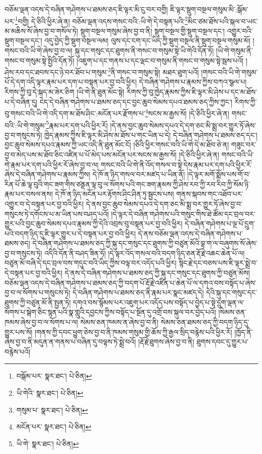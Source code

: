 བཅོམ་ལྡན་འདས་དེ་བཞིན་གཤེགས་པ་ཐམས་ཅད་ཇི་ལྟར་མི་ངུ་བར་བགྱི། ཇི་ལྟར་སྡུག་བསྔལ་གསུམ་མི་:སྒོམ་པར་\footnote{བསྒོམ་པར་  སྣར་ཐང་།  པེ་ཅིན། }བགྱི། དེ་ཅིའི་ཕྱིར་ཞེ་ན། བཅོམ་ལྡན་འདས་གསང་བའི་:ཡི་གེ་དེ་བསྟན་པའི་\footnote{ཡི་གེའི་  སྣར་ཐང་།  པེ་ཅིན། }མིང་ཙམ་ཐོས་པའི་སྐལ་བ་ཡང་མ་མཆིས་སོ་ཞེས་བྱ་བ་གསོལ་ཏེ། སྡུག་བསྔལ་གསུམ་ཞེས་བྱ་བ་ནི། སྡུག་བསྔལ་གྱི་སྡུག་བསྔལ་དང་། འགྱུར་བའི་སྡུག་བསྔལ་དང་། འདུ་བྱེད་ཀྱི་སྡུག་བསྔལ་ལམ། ལུས་དང་ངག་དང་ཡིད་ཀྱི་སྡུག་བསྔལ་ནི་སྡུག་བསྔལ་གསུམ་མོ། །གསང་བའི་ཡི་གེ་ཞེས་བྱ་བ་ལ། སྐུ་དང་གསུང་དང་ཐུགས་ནི་གསང་བ་གསུམ་སྟེ་ཡི་གེའི་དོན་ཏོ། །ཡི་གེ་གསུམ་ནི་གསང་བ་གསུམ་སྟེ་སྤྱིའི་དོན་ཏོ། །འཇུག་པ་དང་གནས་པ་དང་ལྡང་བ་གསུམ་ནི་གསང་བ་གསུམ་སྟེ་སྦས་པའོ། །ཤེས་རབ་དང་ཐབས་དང་ཉེ་བར་ཐོབ་པ་གསུམ་\footnote{གསུམ་པ་  སྣར་ཐང་།  པེ་ཅིན། }ནི་གསང་བ་གསུམ་སྟེ། མཐར་ཐུག་པའོ། །གསང་བའི་ཡི་གེ་གསུམ་པོ་དེ་དག་འདི་ལྟར་རྣམ་པར་དག་པ་བསྟན་པར་བྱ་བའི་ཕྱིར། དེ་བཞིན་གཤེགས་པ་རྣམས་ཀྱིས་བཀའ་སྩལ་པ། རིགས་ཀྱི་བུ་དེ་སྐད་མ་ཟེར་ཅིག །ཡི་གེ་ནི་ཐུན་མོང་སྟེ། རིགས་ཀྱི་བུ་ཁྱེད་རྣམས་ཀྱིས་ཇི་ལྟར་མི་ཤེས་པ་དང་མ་ཐོས་པ་དེ་བཞིན་དུ། ངེད་དེ་བཞིན་གཤེགས་པ་ཐམས་ཅད་དང་བྱང་ཆུབ་སེམས་དཔའ་ཐམས་ཅད་ཀྱིས་ཀྱང་། རིགས་ཀྱི་བུ་གསང་བའི་ཡི་གེ་འདི་དག་མ་ཐོས་ཤིང་:མངོན་པར་རྫོགས་པ་\footnote{མངོན་པར་  སྣར་ཐང་།  པེ་ཅིན། }སངས་མ་རྒྱས་སོ། །དེ་ཅིའི་ཕྱིར་ཞེ་ན། གསང་བའི་:ཡི་གེ་གསུམ་\footnote{ཡི་གེ་  སྣར་ཐང་།  པེ་ཅིན། }རྣམ་པར་དག་པའི་ཕྱིར་རོ། །དེ་ནས་བྱང་ཆུབ་སེམས་དཔའ་དེ་དག་ཅང་མི་སྨྲ་བར་གྱུར་ཏོ་ཞེས་བྱ་བ་གསུངས་ཏེ། ཁྱེད་རྣམས་ཀྱིས་ཇི་ལྟར་མི་ཤེས་མ་ཐོས་པ་གང་ཡིན་པ་དེ། དེ་བཞིན་གཤེགས་པ་ཐམས་ཅད་དང་། བྱང་ཆུབ་སེམས་དཔའ་རྣམས་ཀྱི་ཡང་འདི་ནི་ཐུན་མོང་ངོ། །ཅིའི་ཕྱིར་གསང་བའི་ཡི་གེ་དེ་མ་ཐོབ་ཅེ་ན། གཟུང་བར་བྱ་བ་མེད་པས་མ་ཐོབ་ཅིང་འཛིན་པ་པོ་མེད་པས་མངོན་པར་སངས་མ་རྒྱས་སོ། །དེ་ཅིའི་ཕྱིར་ཞེ་ན། གསང་བའི་ཡི་གེ་རྣམ་པར་དག་པའི་ཕྱིར་རོ་ཞེས་བྱ་བ་ལ། གསང་བའི་ཡི་གེ་ནི་འོད་གསལ་བ་སྟེ་དེས་རྣམ་པར་དག་པའི་ཕྱིར་རོ་ཞེས་དེ་བཞིན་གཤེགས་པ་རྣམས་ཀྱིས། དེ་ཁོ་ན་ཉིད་གསལ་བར་མཛད་པ་ཡིན་ནོ། །དེ་ལྟར་མགོ་སྨོས་པས་གོ་བ་རིན་པོ་ཆེ་ལྟ་བུའི་གང་ཟག་གིས་ཙནྡན་ལྟ་བུ་ལ་སོགས་པའི་གང་ཟག་རྣམས་ཀྱི་ཤེས་རབ་ཀྱི་རབ་རིབ་ཀྱི་སོམ་ཉི་རྣམ་པར་བསལ་ནས། དེ་ཁོ་ན་ཉིད་མངོན་པར་རྟོགས་ཤིང་ཤིན་ཏུ་སྦྱངས་པས། གནས་སྐབས་གང་འཐོབ་པར་འགྱུར་བ་དེ་བསྟན་པར་བྱ་བའི་ཕྱིར། དེ་ནས་བྱང་ཆུབ་སེམས་དཔའ་དེ་དག་ཅང་མི་སྨྲ་བར་གྱུར་ཏོ་ཞེས་བྱ་བ་གསུངས་ཏེ་དགོངས་པ་མ་ཡིན་པས་བཤད་པའོ། །དེ་ལྟར་དེ་བཞིན་གཤེགས་པའི་གསུང་གིས་ཐེ་ཚོམ་དང་བྲལ་བར་གྱུར་པའི་བྱང་ཆུབ་སེམས་དཔའ་རྣམས་ཀྱི་དེའི་འབྲས་བུ་བསྟན་པར་བྱ་བའི་ཕྱིར། དེ་བཞིན་གཤེགས་པ་ལྔ་པོ་དྲུག་པའི་བདག་ཉིད་དུ་ཇི་ལྟར་གྱུར་པ་དེ་བསྟན་པར་བྱ་བའི་ཕྱིར། དེ་ནས་བཅོམ་ལྡན་འདས་དེ་བཞིན་གཤེགས་པ་ཐམས་ཅད། དེ་བཞིན་གཤེགས་པ་ཐམས་ཅད་ཀྱི་སྐུ་དང་གསུང་དང་ཐུགས་ཀྱི་བཙུན་མོའི་བྷ་ག་ལ་བཞུགས་སོ་ཞེས་བྱ་བ་གསུངས་ཏེ། འདིའི་དོན་ནི་བཤད་ཟིན་ཏོ། །དེ་ལྟར་འོད་གསལ་བའི་བདག་ཉིད་ཅན་རྡོ་རྗེ་འཆང་ཆེན་པོ་ལ། བཙུན་མོ་བཞི་དེ་དང་བྲལ་བས་གདུང་བའི་ཡིད་ཀྱིས་བལྟ་བར་འདོད་པའི་ཕྱིར། སྙིང་རྗེ་དང་བཅས་པས་ཇི་ལྟར་སྨྲེ་བ་དེ་བསྟན་པར་བྱ་བའི་ཕྱིར། དེ་ནས་དེ་བཞིན་གཤེགས་པ་ཐམས་ཅད་ཀྱི་སྐུ་དང་གསུང་དང་ཐུགས་ཀྱི་བཙུན་མོས། བཅོམ་ལྡན་འདས་དེ་བཞིན་གཤེགས་པ་ཐམས་ཅད་ཀྱི་བདག་པོ་རྡོ་རྗེ་འཛིན་པ་ཆེན་པོ་ལ་དགའ་བས་བསྟོད་པ་ཞེས་བྱ་བ་ལ་སོགས་པ་གསུངས་ཏེ། དེ་བཞིན་གཤེགས་པ་ཐམས་ཅད་ནི་རྣམ་པར་སྣང་མཛད་དེ། དེའི་སྐུ་དང་གསུང་དང་ཐུགས་ཀྱི་བཙུན་མོ་ནི་སྤྱན་ཏེ། དགའ་བས་སྙོམས་པར་འཇུག་པར་འདོད་པས་བསྟོད་པ་བྱེད་པ་སྟེ་དྲུག་ལྡན་ལ་སོགས་པ་སྒེག་ཅིང་སྙན་པའི་སྣ་གླུའི་དབྱངས་ཀྱིས་བསྟོད་པ་སྔོན་དུ་འགྲོ་བས་སྐུལ་བར་བྱེད་པའོ། །སེམས་ཅན་ཁམས་ཞེས་བྱ་བ་ལ་སོགས་པ་ལ། སེམས་ཅན་ཁམས་ན་ཞེས་བྱ་བ་ནི། སེམས་ཅན་ཐམས་ཅད་ཀྱི་བདག་ཉིད་དུ་གྱུར་པས་སོ། །གནས་ཀྱི་དབང་ཕྱུག་ཅེས་བྱ་བ་ནི་ཁམས་གསུམ་གྱི་ཆོས་ཀྱི་རྒྱལ་སྲིད་བརྙེས་པའི་ཕྱིར་རོ། །ཁྱོད་ནི་ཞེས་བྱ་བ་ནི་མདུན་ན་གནས་པ་བཞིན་དུ་བལྟས་ཏེ་སྨྲེ་བའོ། །རྡོ་རྗེ་ཐུགས་ཞེས་བྱ་བ་ནི། ཐུགས་དབང་དུ་གྱུར་པ་བརྙེས་པའོ། 